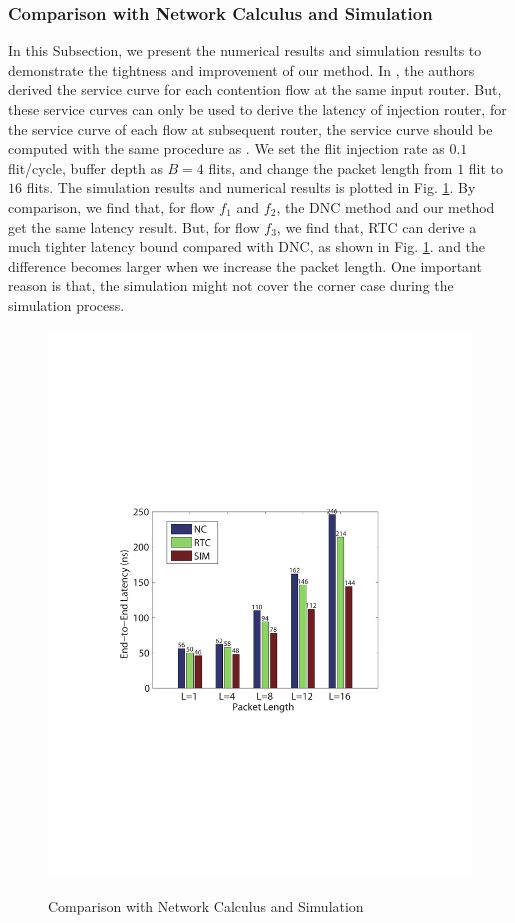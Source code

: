 \documentclass[10pt,journal]{IEEEtran}
\begin{document}
\subsubsection{Comparison with Network Calculus and Simulation}
In this Subsection, we present the numerical results and simulation results to demonstrate the tightness and improvement of our method. In \cite{Qian489900}, the authors derived the service curve for each contention flow at the same input router. But, these service curves can only be used to derive the latency of injection router, for the service curve of each flow at subsequent router, the service curve should be computed with the same procedure as \cite{qian2009analysis}. We set the flit injection rate as $0.1$ flit/cycle, buffer depth as $B=4$ flits, and change the packet length from $1$ flit to $16$ flits. The simulation results and numerical results is plotted in Fig. \ref{comparison}. By comparison, we find that, for flow $f_1$ and $f_2$, the DNC method and our method get the same latency result. But, for flow $f_3$, we find that, RTC can derive a much tighter latency bound compared with DNC, as shown in Fig. \ref{comparison}. and the difference becomes larger when we increase the packet length. One important reason is that, the simulation might not cover the corner case during the simulation process.
\begin{figure}
  \centering
  \includegraphics[scale=0.6]{figures/comparison.pdf}\\
  \caption{Comparison with Network Calculus and Simulation}\label{comparison}
\end{figure}
\end{document}
